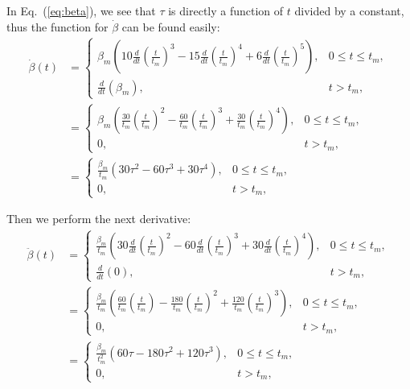\documentclass[titlepage]{article}
\begin{document}
In Eq.~(\ref{eq:beta}), we see that $\tau$ is directly a function of $t$ divided by a constant, thus the function for $\dot{\beta}$ can be found easily:
\begin{equation}
	\begin{split}
		\dot{\beta}(t)&=
		\begin{cases}
			\beta_m\left(10\frac{d}{dt}\left(\frac{t}{t_m}\right)^3-15\frac{d}{dt}\left(\frac{t}{t_m}\right)^4+6\frac{d}{dt}\left(\frac{t}{t_m}\right)^5\right), & 0\leq t\leq t_m,\\
			\frac{d}{dt}\left(\beta_m\right), & t>t_m,
		\end{cases} \\
		&= 
		\begin{cases}
			\beta_m\left(\frac{30}{t_m}\left(\frac{t}{t_m}\right)^2-\frac{60}{t_m}\left(\frac{t}{t_m}\right)^3+\frac{30}{t_m}\left(\frac{t}{t_m}\right)^4\right), & 0\leq t\leq t_m,\\
			0, & t>t_m,
		\end{cases}  \\
		&=
		\begin{cases}
			\frac{\beta_m}{t_m}\left(30\tau^2-60\tau^3+30\tau^4\right), & 0\leq t\leq t_m,\\
			0, & t>t_m,
		\end{cases}
	\end{split}
\end{equation}

Then we perform the next derivative:
\begin{equation}
	\begin{split}
		\ddot{\beta}(t)&=
		\begin{cases}
			\frac{\beta_m}{t_m}\left(30\frac{d}{dt}\left(\frac{t}{t_m}\right)^2-60\frac{d}{dt}\left(\frac{t}{t_m}\right)^3+30\frac{d}{dt}\left(\frac{t}{t_m}\right)^4\right), & 0\leq t\leq t_m,\\
			\frac{d}{dt}\left(0\right), & t>t_m,
		\end{cases} \\
		&= 
		\begin{cases}
			\frac{\beta_m}{t_m}\left(\frac{60}{t_m}\left(\frac{t}{t_m}\right)-\frac{180}{t_m}\left(\frac{t}{t_m}\right)^2+\frac{120}{t_m}\left(\frac{t}{t_m}\right)^3\right), & 0\leq t\leq t_m,\\
			0, & t>t_m,
		\end{cases}  \\
		&=
		\begin{cases}
			\frac{\beta_m}{t_m^2}\left(60\tau-180\tau^2+120\tau^3\right), & 0\leq t\leq t_m,\\
			0, & t>t_m,
		\end{cases}
	\end{split}
\end{equation}
\end{document}
